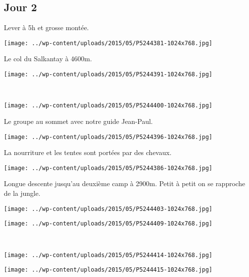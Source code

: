 \subsection*{Jour 2}
Lever à 5h et grosse montée. 
\begin{center} \texttt{[image: ../wp-content/uploads/2015/05/P5244381-1024x768.jpg]} \end{center}
\pagebreak

Le col du Salkantay à 4600m.
\begin{center} \texttt{[image: ../wp-content/uploads/2015/05/P5244391-1024x768.jpg]} \end{center}
~
\begin{center} \texttt{[image: ../wp-content/uploads/2015/05/P5244400-1024x768.jpg]} \end{center}
\vspace{-\topsep}
\pagebreak

Le groupe au sommet avec notre guide Jean-Paul. 
\begin{center} \texttt{[image: ../wp-content/uploads/2015/05/P5244396-1024x768.jpg]} \end{center}

La nourriture et les tentes sont portées par des chevaux. 
\begin{center} \texttt{[image: ../wp-content/uploads/2015/05/P5244386-1024x768.jpg]} \end{center}
\vspace{-\topsep}
\pagebreak

Longue descente jusqu'au deuxième camp à 2900m. Petit à petit on se rapproche de la jungle. 
\begin{center} \texttt{[image: ../wp-content/uploads/2015/05/P5244403-1024x768.jpg]} \end{center}
\begin{center} \texttt{[image: ../wp-content/uploads/2015/05/P5244409-1024x768.jpg]} \end{center}
\vspace{-\topsep}
\vspace{-3.25mm}
\pagebreak
~\\
\begin{center} \texttt{[image: ../wp-content/uploads/2015/05/P5244414-1024x768.jpg]} \end{center}
\begin{center} \texttt{[image: ../wp-content/uploads/2015/05/P5244415-1024x768.jpg]} \end{center}
\vspace{-\topsep}
\vspace{-3.25mm}
\pagebreak

